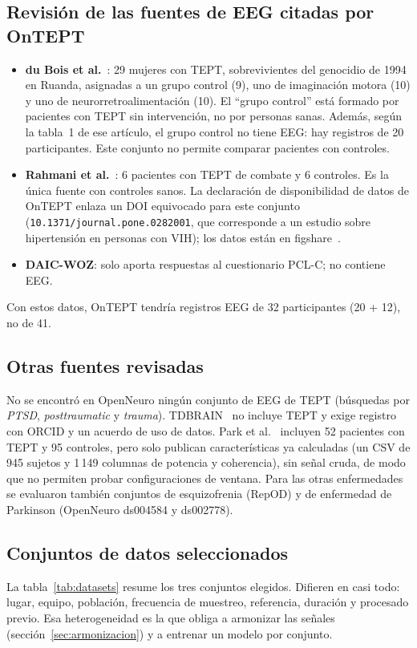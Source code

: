 \documentclass[11pt,a4paper]{article}
\begin{document}
\subsection{Revisión de las fuentes de EEG citadas por OnTEPT}
\begin{itemize}
  \item \textbf{du Bois et al.}~\cite{dubois2022}: 29 mujeres con TEPT, sobrevivientes del genocidio de 1994 en Ruanda, asignadas a un grupo control (9), uno de imaginación motora (10) y uno de neurorretroalimentación (10). El \enquote{grupo control} está formado por pacientes con TEPT sin intervención, no por personas sanas. Además, según la tabla~1 de ese artículo, el grupo control no tiene EEG: hay registros de 20 participantes. Este conjunto no permite comparar pacientes con controles.
  \item \textbf{Rahmani et al.}~\cite{rahmani2018}: 6 pacientes con TEPT de combate y 6 controles. Es la única fuente con controles sanos. La declaración de disponibilidad de datos de OnTEPT enlaza un DOI equivocado para este conjunto (\texttt{10.1371/journal.pone.0282001}, que corresponde a un estudio sobre hipertensión en personas con VIH); los datos están en figshare~\cite{rahmani2018datos}.
  \item \textbf{DAIC-WOZ}: solo aporta respuestas al cuestionario PCL-C; no contiene EEG.
\end{itemize}
Con estos datos, OnTEPT tendría registros EEG de 32 participantes (20 + 12), no de 41.

\subsection{Otras fuentes revisadas}
No se encontró en OpenNeuro ningún conjunto de EEG de TEPT (búsquedas por \emph{PTSD}, \emph{posttraumatic} y \emph{trauma}). TDBRAIN~\cite{vandijk2022} no incluye TEPT y exige registro con ORCID y un acuerdo de uso de datos. Park et al.~\cite{park2021} incluyen 52 pacientes con TEPT y 95 controles, pero solo publican características ya calculadas (un CSV de 945 sujetos y 1\,149 columnas de potencia y coherencia), sin señal cruda, de modo que no permiten probar configuraciones de ventana. Para las otras enfermedades se evaluaron también conjuntos de esquizofrenia (RepOD) y de enfermedad de Parkinson (OpenNeuro ds004584 y ds002778).

\subsection{Conjuntos de datos seleccionados}
La tabla~\ref{tab:datasets} resume los tres conjuntos elegidos. Difieren en casi todo: lugar, equipo, población, frecuencia de muestreo, referencia, duración y procesado previo. Esa heterogeneidad es la que obliga a armonizar las señales (sección~\ref{sec:armonizacion}) y a entrenar un modelo por conjunto.
\end{document}
